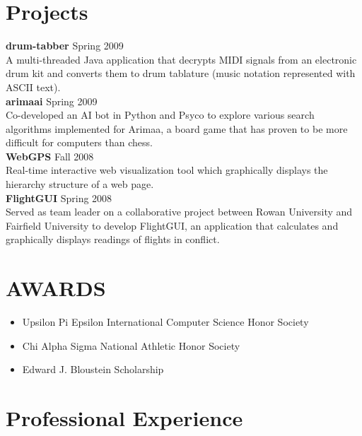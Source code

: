 \documentclass[10pt]{article}
\begin{document}
{\begin{minipage}[t]{0.44\textwidth}
	

\section {Projects}
  {\bf drum-tabber} \hfill Spring 2009 \\
    A multi-threaded Java application that decrypts MIDI signals from an electronic drum kit
    and converts them to drum tablature (music notation represented with ASCII text). \\

  {\bf arimaai} \hfill Spring 2009 \\
    Co-developed an AI bot in Python and Psyco to explore various search algorithms implemented
    for Arimaa, a board game that has proven to be more difficult for computers than chess. \\
    
  {\bf WebGPS} \hfill Fall 2008 \\
    Real-time interactive web visualization tool which 
	graphically displays the hierarchy structure of a web page. \\

  {\bf FlightGUI} \hfill Spring 2008 \\
    Served as team leader on a collaborative project between Rowan University and Fairfield University
    to develop FlightGUI, an application that calculates and graphically displays readings of flights in conflict. \\
   
\section{AWARDS}
  \begin{itemize}  \itemsep -2pt \normalsize
    \item Upsilon Pi Epsilon International Computer Science Honor Society
    \item Chi Alpha Sigma National Athletic Honor Society
    \item Edward J. Bloustein Scholarship
  \end{itemize}

\end{minipage}
\hfill
\begin{minipage}[t]{0.52\textwidth}

	\vspace{0pt}	%


\section{Professional Experience}


\end{minipage}}
\end{document}
